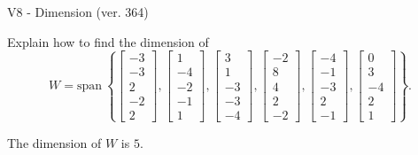 \begin{exercise}
  \begin{exerciseTitle}V8 - Dimension (ver. 364)\end{exerciseTitle}
  \begin{exerciseStatement}
    Explain how to find the dimension of 
\[W=\mathrm{span}\ \left\{\left[\begin{array}{r}
-3 \\
-3 \\
2 \\
-2 \\
2
\end{array}\right] , \left[\begin{array}{r}
1 \\
-4 \\
-2 \\
-1 \\
1
\end{array}\right] , \left[\begin{array}{r}
3 \\
1 \\
-3 \\
-3 \\
-4
\end{array}\right] , \left[\begin{array}{r}
-2 \\
8 \\
4 \\
2 \\
-2
\end{array}\right] , \left[\begin{array}{r}
-4 \\
-1 \\
-3 \\
2 \\
-1
\end{array}\right] , \left[\begin{array}{r}
0 \\
3 \\
-4 \\
2 \\
1
\end{array}\right]\right\}.\]



  \end{exerciseStatement}
  \begin{exerciseAnswer}
   The dimension of \(W\) is  \(5\).
  


  \end{exerciseAnswer}
\end{exercise}